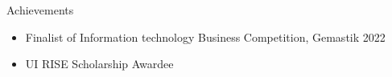\documentclass{resume} %
\begin{document}
\begin{rSection}{Achievements}

\begin{itemize}
\itemsep -7pt {}
\item Finalist of Information technology Business Competition, Gemastik 2022
\item UI RISE Scholarship Awardee
 \end{itemize}
 \vspace{-0.25em}


\end{rSection}
\end{document}
